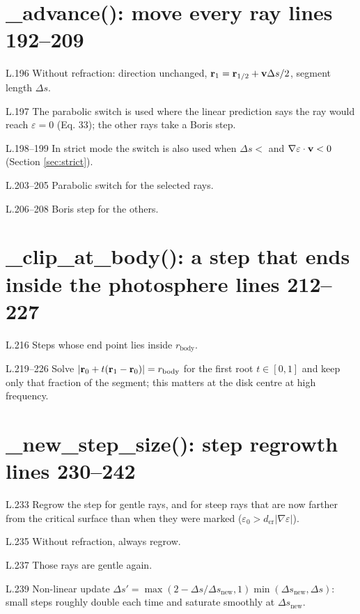 \section*{\normalsize \_advance(): move every ray \hfill{\small\mdseries\color{gray}lines 192--209}}

\begin{lines}
\item[L.196] Without refraction: direction unchanged, $\mathbf{r}_1=\mathbf{r}_{1/2}+\mathbf{v}\Delta s/2$, segment length $\Delta s$.
\item[L.197] The parabolic switch is used where the linear prediction says the ray would reach $\varepsilon=0$ (Eq. 33); the other rays take a Boris step.
\item[L.198–199] In strict mode the switch is also used when $\Delta s<$  and $\nabla\varepsilon\cdot\mathbf{v}<0$ (Section \ref{sec:strict}).
\item[L.203–205] Parabolic switch for the selected rays.
\item[L.206–208] Boris step for the others.
\end{lines}
\section*{\normalsize \_clip\_at\_body(): a step that ends inside the photosphere \hfill{\small\mdseries\color{gray}lines 212--227}}

\begin{lines}
\item[L.216] Steps whose end point lies inside $r_\text{body}$.
\item[L.219–226] Solve $|\mathbf{r}_0+t(\mathbf{r}_1-\mathbf{r}_0)|=r_\text{body}$ for the first root $t\in[0,1]$ and keep only that fraction of the segment; this matters at the disk centre at high frequency.
\end{lines}
\section*{\normalsize \_new\_step\_size(): step regrowth \hfill{\small\mdseries\color{gray}lines 230--242}}

\begin{lines}
\item[L.233] Regrow the step for gentle rays, and for steep rays that are now farther from the critical surface than when they were marked ($\varepsilon_0>d_\text{cr}|\nabla\varepsilon|$).
\item[L.235] Without refraction, always regrow.
\item[L.237] Those rays are gentle again.
\item[L.239] Non-linear update $\Delta s'=\max(2-\Delta s/\Delta s_\text{new},1)\min(\Delta s_\text{new},\Delta s)$: small steps roughly double each time and saturate smoothly at $\Delta s_\text{new}$.
\end{lines}
